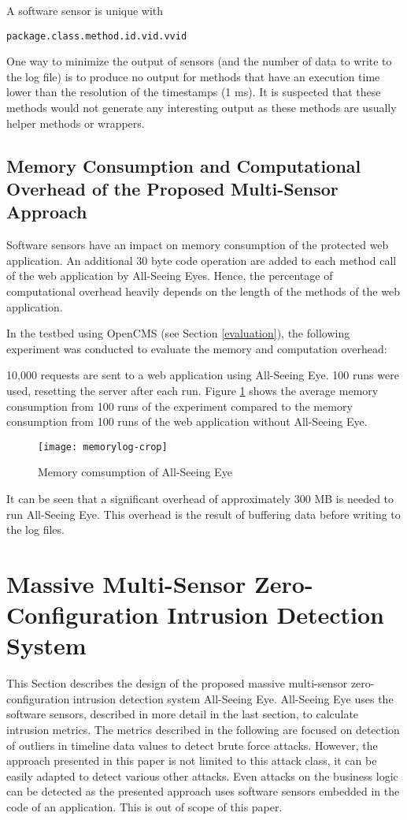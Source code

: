 \documentclass[conference]{IEEEtran}
\begin{document}
A software sensor is unique with 
\begin{lstlisting}
package.class.method.id.vid.vvid
\end{lstlisting}

One way to minimize the output of sensors (and the number of data to write to the log file) is to produce no output for methods that have an execution time lower than the resolution of the timestamps (1 ms). It is suspected that these methods would not generate any interesting output as these methods are usually helper methods or wrappers.


\subsection{Memory Consumption and Computational Overhead of the Proposed Multi-Sensor Approach}
Software sensors have an impact on memory consumption of the protected web application. An additional 30 byte code operation are added to each method call of the web application by All-Seeing Eyes. Hence, the percentage of computational overhead heavily depends on the length of the methods of the web application. 

In the testbed using OpenCMS (see Section \ref{evaluation}), the following experiment was conducted to evaluate the memory and computation overhead:

10,000 requests are sent to a web application using All-Seeing Eye. 100 runs were used, resetting the server after each run. Figure \ref{figure:memorylog-crop} shows the average memory consumption from 100 runs of the experiment compared to the memory consumption from 100 runs of the web application without All-Seeing Eye.
\begin{figure}
 \centering
\texttt{[image: memorylog-crop]} 
\caption{Memory comsumption of All-Seeing Eye}\label{figure:memorylog-crop}
\end{figure}
 It can be seen that a significant overhead of approximately 300 MB is needed to run All-Seeing Eye. This overhead is the result of buffering data before writing to the log files. 


\section{Massive Multi-Sensor Zero-Configuration Intrusion Detection System}\label{mmso}
This Section describes the design of the proposed massive multi-sensor zero-configuration intrusion detection system All-Seeing Eye.
All-Seeing Eye uses the software sensors, described in more detail in the last section, to calculate intrusion metrics. 
The metrics described in the following are focused on detection of outliers in timeline data values to detect brute force attacks.
However, the approach presented in this paper is not limited to this attack class, it can be easily adapted to detect various other attacks.
Even attacks on the business logic can be detected as the presented approach uses software sensors embedded in the code of an application. This is out of scope of this paper.
\end{document}
